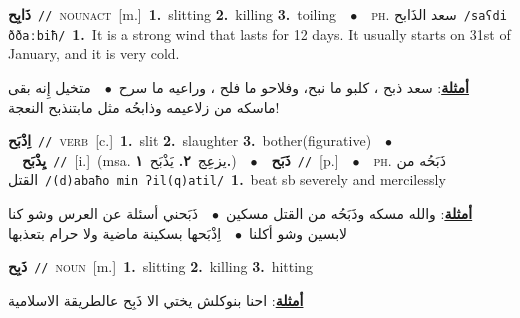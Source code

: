 \documentclass[10pt,a4paper,twoside]{article} %
\begin{document}
\begin{multicols}{2}
{\setlength\topsep{0pt}\textbf{\foreignlanguage{arabic}{ذَابِح}}\ {\color{gray}\texttt{//}\color{black}}\ \textsc{noun\textunderscore act}\ [m.]\ \textbf{1.}~slitting  \textbf{2.}~killing  \textbf{3.}~toiling\ \ $\bullet$\ \ \textsc{ph.} \color{gray} \foreignlanguage{arabic}{سعد الذَابح}\color{black}\ {\color{gray}\texttt{/{\sffamily saʕdi ððaːbiħ}/}\color{black}}\ \textbf{1.}~It is a strong wind that lasts for 12 days. It usually starts on 31st of January, and it is very cold.\  \begin{flushright}\color{gray}\foreignlanguage{arabic}{\textbf{\underline{\foreignlanguage{arabic}{أمثلة}}}: سعد ذبح ، كلبو ما نبح، وفلاحو ما فلح ، وراعيه ما سرح\ $\bullet$\ \  متخيل إِنه بقى ماسكه من زلاعيمه وذابحُه مثل مابتنذبح النعجة!}\end{flushright}\color{black}} \vspace{2mm}

{\setlength\topsep{0pt}\textbf{\foreignlanguage{arabic}{اِذْبَح}}\ {\color{gray}\texttt{//}\color{black}}\ \textsc{verb}\ [c.]\ \textbf{1.}~slit  \textbf{2.}~slaughter  \textbf{3.}~bother(figurative)\ \ $\bullet$\ \ \setlength\topsep{0pt}\textbf{\foreignlanguage{arabic}{يِذْبَح}}\ {\color{gray}\texttt{//}\color{black}}\ [i.]\ \color{gray}(msa. \foreignlanguage{arabic}{يزعِج}~\foreignlanguage{arabic}{\textbf{٢.}}  \foreignlanguage{arabic}{يَذْبَح}~\foreignlanguage{arabic}{\textbf{١.}})\color{black}\ \ $\bullet$\ \ \setlength\topsep{0pt}\textbf{\foreignlanguage{arabic}{ذَبَح}}\ {\color{gray}\texttt{//}\color{black}}\ [p.]\ \ $\bullet$\ \ \textsc{ph.} \color{gray} \foreignlanguage{arabic}{ذَبَحُه من القتل}\color{black}\ {\color{gray}\texttt{/{\sffamily (d)abaħo min ʔil(q)atil}/}\color{black}}\ \textbf{1.}~beat sb severely and mercilessly\  \begin{flushright}\color{gray}\foreignlanguage{arabic}{\textbf{\underline{\foreignlanguage{arabic}{أمثلة}}}: والله مسكه وذَبَحُه من القتل مسكين\ $\bullet$\ \  ذَبَحني أسئلة عن العرس وشو كنا لابسين وشو أكلنا\ $\bullet$\ \  اِذْبَحها بسكينة ماضية ولا حرام بتعذبها}\end{flushright}\color{black}} \vspace{2mm}

{\setlength\topsep{0pt}\textbf{\foreignlanguage{arabic}{ذَبِح}}\ {\color{gray}\texttt{//}\color{black}}\ \textsc{noun}\ [m.]\ \textbf{1.}~slitting  \textbf{2.}~killing  \textbf{3.}~hitting\  \begin{flushright}\color{gray}\foreignlanguage{arabic}{\textbf{\underline{\foreignlanguage{arabic}{أمثلة}}}: احنا بنوكلش يختي الا ذَبِح عالطريقة الاسلامية}\end{flushright}\color{black}} \vspace{2mm}


\end{multicols}
\end{document}
